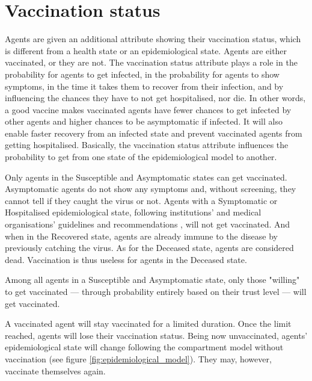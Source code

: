 \section{Vaccination status}
\label{concept_vaccination_status}

Agents are given an additional attribute showing their vaccination status, which is different from a health state or an epidemiological state. Agents are either vaccinated, or they are not. The vaccination status attribute plays a role in the probability for agents to get infected, in the probability for agents to show symptoms, in the time it takes them to recover from their infection, and by influencing the chances they have to not get hospitalised, nor die. In other words, a good vaccine makes vaccinated agents have fewer chances to get infected by other agents and higher chances to be asymptomatic if infected. It will also enable faster recovery from an infected state and prevent vaccinated agents from getting hospitalised. Basically, the vaccination status attribute influences the probability to get from one state of the epidemiological model to another.

Only agents in the Susceptible and Asymptomatic states can get vaccinated. Asymptomatic agents do not show any symptoms and, without screening, they cannot tell if they caught the virus or not. Agents with a Symptomatic or Hospitalised epidemiological state, following institutions' and medical organisations' guidelines and recommendations \cite{who_vaccine_advice_2022}, will not get vaccinated. And when in the Recovered state, agents are already immune to the disease by previously catching the virus. As for the Deceased state, agents are considered dead. Vaccination is thus useless for agents in the Deceased state.

Among all agents in a Susceptible and Asymptomatic state, only those "willing" to get vaccinated --- through probability entirely based on their trust level --- will get vaccinated.

A vaccinated agent will stay vaccinated for a limited duration. Once the limit reached, agents will lose their vaccination status. Being now unvaccinated, agents' epidemiological state will change following the compartment model without vaccination (see figure  \ref{fig:epidemiological_model}). They may, however, vaccinate themselves again.

